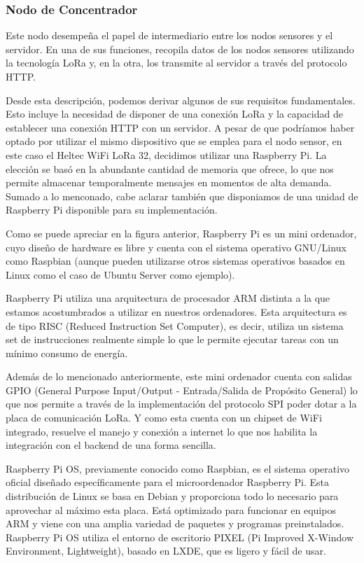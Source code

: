 \clearpage

\subsubsection{Nodo de Concentrador}
Este nodo desempeña el papel de intermediario entre los nodos sensores y el servidor. En una de sus funciones, recopila datos de los nodos sensores utilizando la tecnología LoRa y, en la otra, los transmite al servidor a través del protocolo HTTP.

Desde esta descripción, podemos derivar algunos de sus requisitos fundamentales. Esto incluye la necesidad de disponer de una conexión LoRa y la capacidad de establecer una conexión HTTP con un servidor. A pesar de que podríamos haber optado por utilizar el mismo dispositivo que se emplea para el nodo sensor, en este caso el Heltec WiFi LoRa 32, decidimos utilizar una Raspberry Pi. La elección se basó en la abundante cantidad de memoria que ofrece, lo que nos permite almacenar temporalmente mensajes en momentos de alta demanda. Sumado a lo menconado, cabe aclarar también que disponiamos de una unidad de Raspberry Pi disponible para su implementación.



Como se puede apreciar en la figura anterior, Raspberry Pi es un mini ordenador, cuyo diseño de hardware es libre y cuenta con el sistema operativo GNU/Linux como Raspbian (aunque pueden utilizarse otros sistemas operativos basados en Linux como el caso de Ubuntu Server como ejemplo). 


Raspberry Pi utiliza una arquitectura de procesador ARM distinta a la que estamos acostumbrados a utilizar en nuestros ordenadores. Esta arquitectura es de tipo RISC (Reduced Instruction Set Computer), es decir, utiliza un sistema set de instrucciones realmente simple lo que le permite ejecutar tareas con un mínimo consumo de energía.

Además de lo mencionado anteriormente, este mini ordenador cuenta con salidas GPIO (General Purpose Input/Output - Entrada/Salida de Propósito General) lo que nos permite a través de la implementación del protocolo SPI poder dotar a la placa de comunicación LoRa. Y como esta cuenta con un chipset de WiFi integrado, resuelve el manejo y conexión a internet lo que nos habilita la integración con el backend de una forma sencilla.


Raspberry Pi OS, previamente conocido como Raspbian, es el sistema operativo oficial diseñado específicamente para el microordenador Raspberry Pi. Esta distribución de Linux se basa en Debian y proporciona todo lo necesario para aprovechar al máximo esta placa. Está optimizado para funcionar en equipos ARM y viene con una amplia variedad de paquetes y programas preinstalados. Raspberry Pi OS utiliza el entorno de escritorio PIXEL (Pi Improved X-Window Environment, Lightweight), basado en LXDE, que es ligero y fácil de usar.

